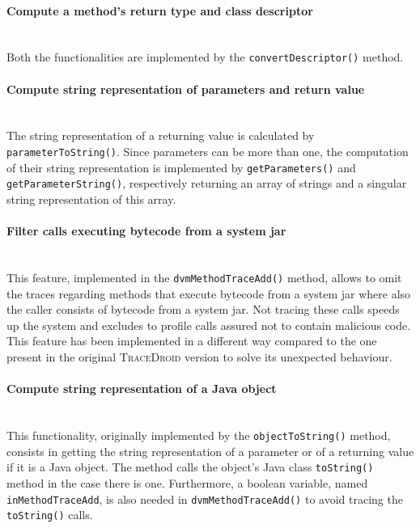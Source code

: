 \paragraph{Compute a method's return type and class descriptor} ~\\
Both the functionalities are implemented by the \texttt{convertDescriptor()} method.

\paragraph{Compute string representation of parameters and return value} ~\\
The string representation of a returning value is calculated by
\texttt{parameterToString()}. Since parameters can be more than one,
the computation of their string representation is implemented by
\texttt{getParameters()} and \texttt{getParameterString()},
respectively returning an array of strings and a singular string
representation of this array.

\paragraph{Filter calls executing bytecode from a system jar} ~\\
This feature, implemented in the \texttt{dvmMethodTraceAdd()} method,
allows to omit the traces regarding methods that execute bytecode from
a system jar where also the caller consists of bytecode from a system
jar. Not tracing these calls speeds up the system and excludes to
profile calls assured not to contain malicious code. This feature has
been implemented in a different way compared to the one present in the
original \textsc{TraceDroid} version to solve its unexpected behaviour.

\paragraph{Compute string representation of a Java object} ~\\
This functionality, originally implemented by the
\texttt{objectToString()} method, consists in getting the string
representation of a parameter or of a returning value if it is a Java
object. The method calls the object's Java class \texttt{toString()}
method in the case there is one. Furthermore, a boolean variable,
named \texttt{inMethodTraceAdd}, is also needed in
\texttt{dvmMethodTraceAdd()} to avoid tracing the \texttt{toString()}
calls.

